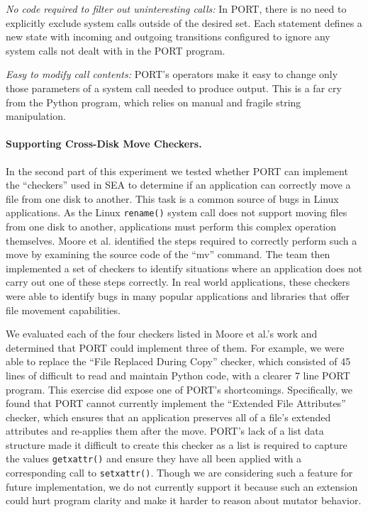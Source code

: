 \textit{No code required to filter out uninteresting calls:}
In PORT, there is no
need to explicitly exclude system
calls outside of the desired set.  Each statement defines a new state with
incoming and outgoing transitions configured to ignore any system calls not
dealt with in the PORT program.

\textit{Easy to modify call contents:}  PORT's operators make it
easy to change only those parameters  of a system call
 needed to produce output.
This is a far cry
from the Python program, which relies on manual and fragile string manipulation.

\paragraph{Supporting Cross-Disk Move Checkers.}

In the second part of this experiment we tested whether PORT can
implement the ``checkers'' used in SEA to determine if an
application can correctly move a file from one disk to another.
This task is a common source of bugs in Linux applications. As the
Linux
{\tt rename()} system call does not support moving files from one disk to
another,
applications must perform this complex
operation themselves.
Moore et al. identified the steps required to
correctly perform such a move by examining the source code of the ``mv''
command. The team then implemented a set of checkers to identify situations where an application does not carry out one
of these steps correctly. 
In real world applications,
these checkers were able to identify bugs
in many popular applications and libraries that offer file movement
capabilities.

We evaluated each of the four checkers listed in Moore et al.'s work and
determined that PORT could implement three of them.
For example, 
we were able to replace the ``File Replaced During Copy'' checker,
which consisted of 45 lines of difficult to read and maintain Python code,
with a clearer 7 line PORT program.
This exercise did expose one of PORT's shortcomings.  Specifically,
we found that PORT cannot currently implement the ``Extended File
Attributes'' checker, which
 ensures that an application
preserves all of a file's extended attributes and re-applies them after the move.
PORT's lack of a list data structure made it difficult to create this checker as a
list is required to capture the values {\tt getxattr()}
and ensure they have all been applied with a
corresponding call to {\tt setxattr()}.
Though we are considering such a feature for future implementation,
we do not currently support it because such an extension could
hurt program clarity and make it harder to reason about
mutator behavior.


